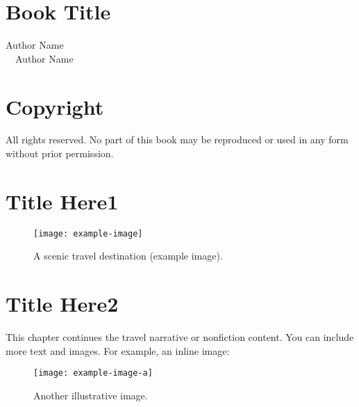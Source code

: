 \documentclass[10pt]{book}
\begin{document}
\frontmatter

\chapter*{\centering \Huge Book Title}
\thispagestyle{empty}   %
\vspace{1em}
\begin{center}
  {\Large Author Name}\\[1ex]
  {\normalsize \textcopyright\ \the\year\ Author Name}
\end{center}
\newpage

\chapter*{Copyright}
\noindent All rights reserved. No part of this book may be reproduced or used 
in any form without prior permission.
\newpage

\tableofcontents

\mainmatter

\chapter{Title Here1}
\lipsum[1]  %

\begin{figure}[htbp]
  \centering
  \texttt{[image: example-image]} %
  \caption{A scenic travel destination (example image).}
\end{figure}

\lipsum[2]  %

\chapter{Title Here2}
This chapter continues the travel narrative or nonfiction content. You can include more text and images. For example, an inline image:
\begin{figure}[htbp]
  \centering
  \texttt{[image: example-image-a]} 
  \caption{Another illustrative image.}
\end{figure}

\end{document}
